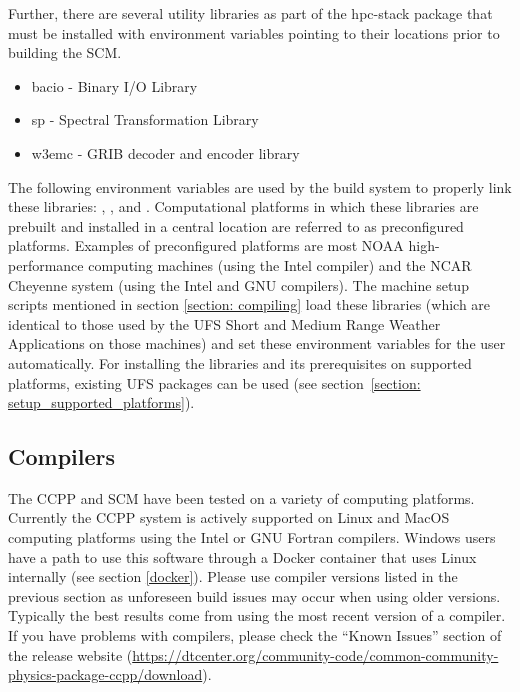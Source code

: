 Further, there are several utility libraries as part of the hpc-stack package that must be installed with environment variables pointing to their locations prior to building the SCM.
\begin{itemize}
    \item bacio - Binary I/O Library
    \item sp - Spectral Transformation Library
    \item w3emc - GRIB decoder and encoder library
\end{itemize}
The following environment variables are used by the build system to properly link these libraries: , , and . Computational platforms in which these libraries are prebuilt and installed in a central location are referred to as preconfigured platforms. Examples of preconfigured platforms are most NOAA high-performance computing machines (using the Intel compiler) and the NCAR Cheyenne system (using the Intel and GNU compilers). The machine setup scripts mentioned in section \ref{section: compiling} load these libraries (which are identical to those used by the UFS Short and Medium Range Weather Applications on those machines) and set these environment variables for the user automatically. For installing the libraries and its prerequisites on supported platforms, existing UFS packages can be used (see section~\ref{section: setup_supported_platforms}).

\subsection{Compilers}
The CCPP and SCM have been tested on a variety of
computing platforms. Currently the CCPP system is actively supported
on Linux and MacOS computing platforms using the Intel or GNU Fortran
compilers. Windows users have a path to use this software through a Docker container that uses Linux internally (see section \ref{docker}). Please use compiler versions listed in the previous section as unforeseen
build issues may occur when using older versions. Typically the best results come from using the
most recent version of a compiler. If you have problems with compilers, please check the ``Known Issues'' section of the
release website (\url{https://dtcenter.org/community-code/common-community-physics-package-ccpp/download}).

